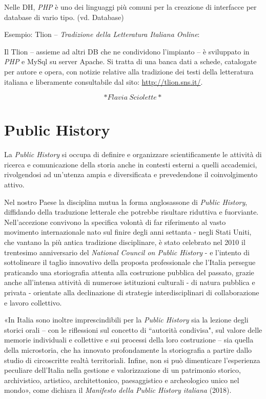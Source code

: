 \documentclass[
  b5paper,
  twoside,
  12pt,
  chapterprefix=false,
  bibliography=totocnumbered,
  parskip=false]{scrbook}
\begin{document}
Nelle DH, \emph{PHP} è uno dei linguaggi più comuni per la creazione di
interfacce per database di vario tipo. (vd. Database)

Esempio: Tlion -- \emph{Tradizione della Letteratura Italiana Online}:

Il Tlion -- assieme ad altri DB che ne condividono l'impianto -- è
sviluppato in \emph{PHP} e MySql su server Apache. Si tratta di una banca
dati a schede, catalogate per autore e opera, con notizie relative alla
tradizione dei testi della letteratura italiana e liberamente
consultabile dal sito: \url{http://tlion.sns.it/}.

\[*Flavia~Sciolette*\]

\hypertarget{public-history}{%
\chapter{Public History}\label{public-history}}

La \emph{Public History} si occupa di definire e organizzare scientificamente
le attività di ricerca e comunicazione della storia anche in contesti
esterni a quelli accademici, rivolgendosi ad un'utenza ampia e
diversificata e prevedendone il coinvolgimento attivo.

Nel nostro Paese la disciplina mutua la forma anglosassone di \emph{Public
History}, diffidando della traduzione letterale che potrebbe risultare
riduttiva e fuorviante. Nell'accezione convivono la specifica volontà di
far riferimento al vasto movimento internazionale nato sul finire degli
anni settanta - negli Stati Uniti, che vantano la più antica tradizione
disciplinare, è stato celebrato nel 2010 il trentesimo anniversario del
\emph{National Council on Public History} - e l'intento di sottolineare il
taglio innovativo della proposta professionale che l'Italia persegue
praticando una storiografia attenta alla costruzione pubblica del
passato, grazie anche all'intensa attività di numerose istituzioni
culturali - di natura pubblica e privata - orientate alla declinazione
di strategie interdisciplinari di collaborazione e lavoro collettivo.

«In Italia sono inoltre imprescindibili per la \emph{Public History} sia la
lezione degli storici orali -- con le riflessioni sul concetto di
``autorità condivisa", sul valore delle memorie individuali e collettive
e sui processi della loro costruzione -- sia quella della microstoria,
che ha innovato profondamente la storiografia a partire dallo studio di
circoscritte realtà territoriali. Infine, non si può dimenticare
l'esperienza peculiare dell'Italia nella gestione e valorizzazione di un
patrimonio storico, archivistico, artistico, architettonico,
paesaggistico e archeologico unico nel mondo», come dichiara il
\emph{Manifesto della Public History italiana} (2018).
\end{document}
